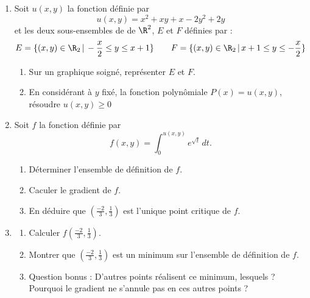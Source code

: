 \begin{exercice}
\begin{enumerate}
\item Soit $u(x,y)$ la fonction définie par 
$$u(x,y) = x^2+xy +x-2y^2+2y$$
et  les deux sous-ensembles de de $\R^2$, $E$ et $F$ définies par : 
$$E = \{ (x,y) \in \R_2 \, | \,  -\frac{x}{2} \leq  y  \leq x+1\}\quad \quad F = \{ (x,y) \in \R_2 \, | \, x+1 \leq  y  \leq - \frac{x}{2}\}$$

\begin{enumerate}
\item Sur un graphique soigné,  représenter $E$ et $F$. 
\item En considérant à $y$  fixé, la fonction polynômiale $P(x) = u(x,y)$, résoudre $u(x,y)\geq 0$\\
\end{enumerate}
\item   Soit $f$ la fonction définie par  $$f(x,y) = \int_{0}^{u(x,y) }e^{\sqrt{t}}\,  dt.$$
\begin{enumerate}
\item Déterminer l'ensemble de définition de $f$. 
\item Caculer le gradient de $f$.
\item En déduire que $\left(\frac{-2}{3},\frac{1}{3}\right)$ est l'unique point critique de $f$. 
\end{enumerate}
\item 
\begin{enumerate}
\item Calculer $f\left(\frac{-2}{3},\frac{1}{3}\right)$.
\item Montrer que $\left(\frac{-2}{3},\frac{1}{3}\right)$ est un minimum sur l'ensemble de définition de $f$. 
\item Question bonus  : D'autres points réalisent ce minimum, lesquels ? Pourquoi le gradient ne s'annule pas en ces autres points ? 
\end{enumerate}
\end{enumerate}
\end{exercice}



